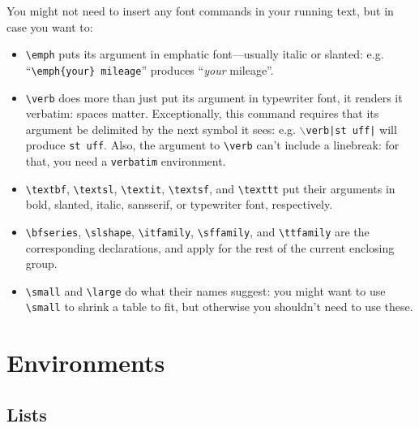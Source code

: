 \documentclass[dissertation]{softeng}
\begin{document}
You might not need to insert any font commands in your running text,
but in case you want to: 
\begin{itemize}\raggedright
\item \verb|\emph| puts its argument in emphatic font---usually italic
  or slanted: e.g.\\ ``\verb|\emph{your} mileage|'' produces
  ``\emph{your} mileage''.
\item
  \verb|\verb| does more than just put its argument in typewriter 
  font, it renders it verbatim: spaces matter. %
  Exceptionally, this command requires that its argument be delimited
  by the next symbol it sees: %
  e.g.  \texttt{$\mathtt\backslash$verb|st\ uff|} will produce
  \verb|st uff|.  Also, the argument to
  \verb|\verb| can't include a linebreak: for that, you need a
  \verb|verbatim| environment.
\item \verb|\textbf|, \verb|\textsl|, \verb|\textit|, \verb|\textsf|,
  and \verb|\texttt| put their arguments in bold, slanted, italic,
  sansserif, or typewriter font, respectively.
\item \verb|\bfseries|, \verb|\slshape|, \verb|\itfamily|,
  \verb|\sffamily|, and \verb|\ttfamily| are the corresponding
  declarations, and apply for the rest of the current enclosing group.
\item \verb|\small| and \verb|\large| do what their names suggest: you
  might want to use \verb|\small| to shrink a table to fit, but
  otherwise you shouldn't need to use these.  
\end{itemize}

\section{Environments}

\subsection{Lists}
\end{document}
